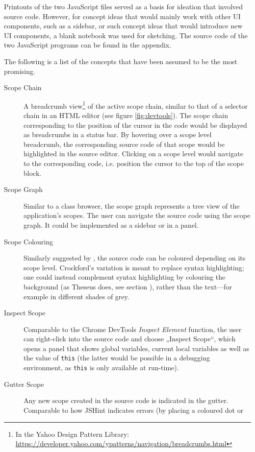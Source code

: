 Printouts of the two JavaScript files served as a basis for ideation
that involved source code. However, for concept ideas that would mainly
work with other UI components, such as a sidebar, or such concept ideas
that would introduce new UI components, a blank notebook was used for
sketching. The source code of the two JavaScript programs can be found
in the appendix.

The following is a list of the concepts that have been assumed to be the
most promising.

\begin{description}
\item[Scope Chain]
A breadcrumb
view\footnote{In the Yahoo Design Pattern Library: \url{https://developer.yahoo.com/ypatterns/navigation/breadcrumbs.html}}
of the active scope chain, similar to that of a selector chain in an
HTML editor (see figure \ref{fig:devtools}). The scope chain
corresponding to the position of the cursor in the code would be
displayed as breadcrumbs in a status bar. By hovering over a scope level
breadcrumb, the corresponding source code of that scope would be
highlighted in the source editor. Clicking on a scope level would
navigate to the corresponding code, i.e. position the cursor to the top
of the scope block.
\item[Scope Graph]
Similar to a class browser, the scope graph represents a tree view of
the application’s scopes. The user can navigate the source code using
the scope graph. It could be implemented as a sidebar or in a panel.
\item[Scope Colouring]
Similarly suggested by , the source code can be
coloured depending on its scope level. Crockford’s variation is meant to
replace syntax highlighting; one could instead complement syntax
highlighting by colouring the background (as Theseus does, see section
), rather than the text—for example in different shades
of grey.
\item[Inspect Scope]
Comparable to the Chrome DevTools \emph{Inspect Element} function, the
user can right-click into the source code and choose „Inspect Scope“,
which opens a panel that shows global variables, current local variables
as well as the value of \texttt{this} (the latter would be possible in a
debugging environment, as \texttt{this} is only available at run-time).
\item[Gutter Scope]
Any new scope created in the source code is indicated in the gutter.
Comparable to how JSHint indicates errors (by placing a coloured dot or

\end{description}
